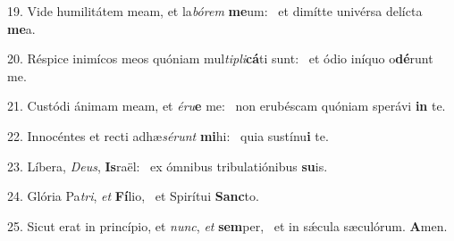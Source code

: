 19. Vide humilitátem meam, et la\textit{bó}\textit{rem} \textbf{me}um: \ast\  et dimítte univérsa delícta \textbf{me}a.\

20. Réspice inimícos meos quóniam mul\textit{ti}\textit{pli}\textbf{cá}ti sunt: \ast\  et ódio iníquo o\textbf{dé}runt me.\

21. Custódi ánimam meam, et \textit{é}\textit{ru}\textbf{e} me: \ast\  non erubéscam quóniam sperávi \textbf{in} te.\

22. Innocéntes et recti adhæ\textit{sé}\textit{runt} \textbf{mi}hi: \ast\  quia sustínu\textbf{i} te.\

23. Líbera, \textit{De}\textit{us}, \textbf{Is}raël: \ast\  ex ómnibus tribulatiónibus \textbf{su}is.\

24. Glória Pa\textit{tri}, \textit{et} \textbf{Fí}lio, \ast\  et Spirítui \textbf{Sanc}to.\

25. Sicut erat in princípio, et \textit{nunc}, \textit{et} \textbf{sem}per, \ast\  et in sǽcula sæculórum. \textbf{A}men.\

